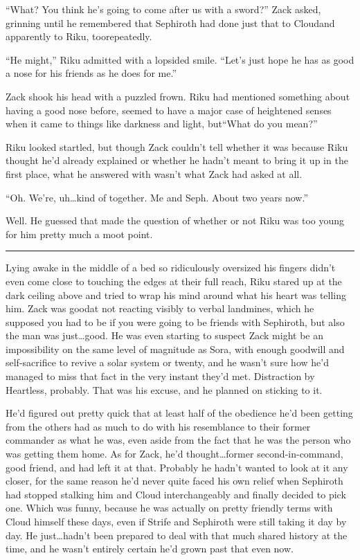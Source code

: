 ``What? You think he's going to come after us with a sword?'' Zack asked, grinning until he remembered that Sephiroth had done just that to Cloud\textemdash and apparently to Riku, too\textemdash repeatedly.

``He might,'' Riku admitted with a lopsided smile. ``Let's just hope he has as good a nose for his friends as he does for me.''

Zack shook his head with a puzzled frown. Riku had mentioned something about having a good nose before, seemed to have a major case of heightened senses when it came to things like darkness and light, but\textemdash  ``What do you mean?''

Riku looked startled, but though Zack couldn't tell whether it was because Riku thought he'd already explained or whether he hadn't meant to bring it up in the first place, what he answered with wasn't what Zack had asked at all.

``Oh. We're, uh\ldots kind of together. Me and Seph. About two years now.''

Well. He guessed that made the question of whether or not Riku was too young for him pretty much a moot point.

\fancybreak{\pfbreakdisplay}


Lying awake in the middle of a bed so ridiculously oversized his fingers didn't even come close to touching the edges at their full reach, Riku stared up at the dark ceiling above and tried to wrap his mind around what his heart was telling him. Zack was good\textemdash at not reacting visibly to verbal landmines, which he supposed you had to be if you were going to be friends with Sephiroth, but also the man was just\ldots good. He was even starting to suspect Zack might be an impossibility on the same level of magnitude as Sora, with enough goodwill and self-sacrifice to revive a solar system or twenty, and he wasn't sure how he'd managed to miss that fact in the very instant they'd met. Distraction by Heartless, probably. That was his excuse, and he planned on sticking to it.

He'd figured out pretty quick that at least half of the obedience he'd been getting from the others had as much to do with his resemblance to their former commander as what he was, even aside from the fact that he was the person who was getting them home. As for Zack, he'd thought\ldots former second-in-command, good friend, and had left it at that. Probably he hadn't wanted to look at it any closer, for the same reason he'd never quite faced his own relief when Sephiroth had stopped stalking him and Cloud interchangeably and finally decided to pick one. Which was funny, because he was actually on pretty friendly terms with Cloud himself these days, even if Strife and Sephiroth were still taking it day by day. He just\ldots hadn't been prepared to deal with that much shared history at the time, and he wasn't entirely certain he'd grown past that even now.

